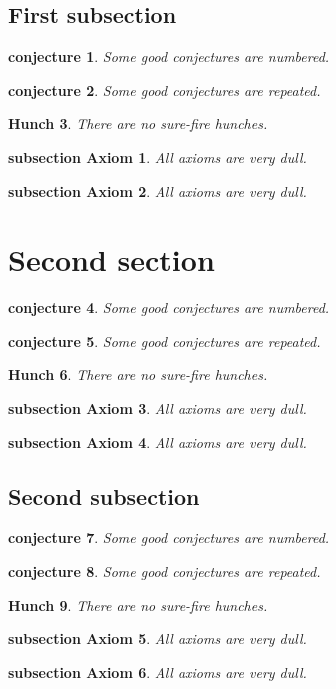 \documentclass{article}
\newtheorem{guess}{conjecture}
\newtheorem{axiom}{subsection Axiom}[subsection]
\newtheorem{hunch}[guess]{Hunch}
\begin{document}
\subsection{First subsection}
\begin{guess}Some good conjectures are numbered.\end{guess}
\begin{guess}Some good conjectures are repeated.\end{guess}
\begin{hunch} There are no sure-fire hunches. \end{hunch}
\begin{axiom} All axioms are very dull. \end{axiom}
\begin{axiom} All axioms are very dull. \end{axiom}

\section{Second section}
\begin{guess}Some good conjectures are numbered.\end{guess}
\begin{guess}Some good conjectures are repeated.\end{guess}
\begin{hunch} There are no sure-fire hunches. \end{hunch}
\begin{axiom} All axioms are very dull. \end{axiom}
\begin{axiom} All axioms are very dull. \end{axiom}

\subsection{Second subsection}
\begin{guess}Some good conjectures are numbered.\end{guess}
\begin{guess}Some good conjectures are repeated.\end{guess}
\begin{hunch} There are no sure-fire hunches. \end{hunch}
\begin{axiom} All axioms are very dull. \end{axiom}
\begin{axiom} All axioms are very dull. \end{axiom}
\end{document}
